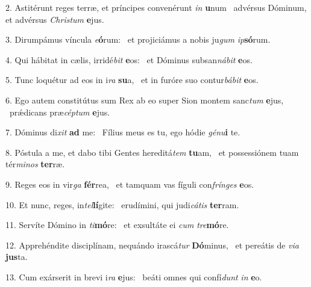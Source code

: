 2. Astitérunt reges terræ, et príncipes convenérunt \textit{in} \textbf{u}num \ast\  advérsus Dóminum, et advérsus \textit{Chris}\textit{tum} \textbf{e}jus.\

3. Dirumpámus víncula \textit{e}\textbf{ó}rum: \ast\  et projiciámus a nobis ju\textit{gum} \textit{ip}\textbf{só}rum.\

4. Qui hábitat in cælis, irridé\textit{bit} \textbf{e}os: \ast\  et Dóminus subsan\textit{ná}\textit{bit} \textbf{e}os.\

5. Tunc loquétur ad eos in i\textit{ra} \textbf{su}a, \ast\  et in furóre suo contur\textit{bá}\textit{bit} \textbf{e}os.\

6. Ego autem constitútus sum Rex ab eo super Sion montem sanc\textit{tum} \textbf{e}jus, \ast\  prǽdicans præ\textit{cép}\textit{tum} \textbf{e}jus.\

7. Dóminus di\textit{xit} \textbf{ad} me: \ast\  Fílius meus es tu, ego hódie \textit{gé}\textit{nu}\textbf{i} te.\

8. Póstula a me, et dabo tibi Gentes hereditá\textit{tem} \textbf{tu}am, \ast\  et possessiónem tuam tér\textit{mi}\textit{nos} \textbf{ter}ræ.\

9. Reges eos in vir\textit{ga} \textbf{fér}rea, \ast\  et tamquam vas fíguli con\textit{frín}\textit{ges} \textbf{e}os.\

10. Et nunc, reges, in\textit{tel}\textbf{lí}gite: \ast\  erudímini, qui judi\textit{cá}\textit{tis} \textbf{ter}ram.\

11. Servíte Dómino in \textit{ti}\textbf{mó}re: \ast\  et exsultáte ei \textit{cum} \textit{tre}\textbf{mó}re.\

12. Apprehéndite disciplínam, nequándo irascá\textit{tur} \textbf{Dó}minus, \ast\  et pereátis de \textit{vi}\textit{a} \textbf{jus}ta.\

13. Cum exárserit in brevi i\textit{ra} \textbf{e}jus: \ast\  beáti omnes qui confí\textit{dunt} \textit{in} \textbf{e}o.\

